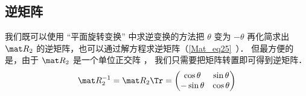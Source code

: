 \subsection{逆矩阵}
我们既可以使用 “平面旋转变换” 中求逆变换的方法把 $\theta$ 变为 $-\theta$ 再化简求出 $\mat R_2$ 的逆矩阵，也可以通过解方程求逆矩阵（\autoref{Mat_eq25}~）． 但最方便的是，由于 $\mat R_2$ 是一个单位正交阵%
， 我们只需要把矩阵转置即可得到逆矩阵．
\begin{equation}
\mat R_2^{-1} = \mat R_2\Tr = \begin{pmatrix}
\cos\theta &\sin\theta \\
-\sin\theta &\cos\theta
\end{pmatrix}
\end{equation}
